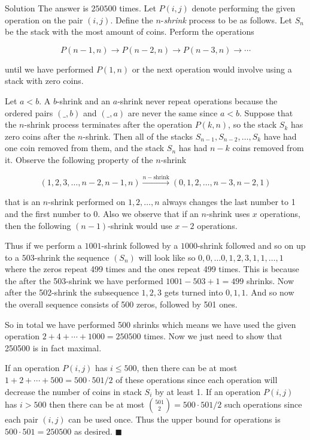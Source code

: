 \documentclass{article}
\begin{document}
\begin{solution}{Solution}
The answer is $250500$ times.
Let $P(i,j)$ denote
performing the given operation on the pair $(i,j)$.
Define the $n$-\textit{shrink} process to be as follows. Let $S_n$ be the
stack with the most amount of coins.
Perform the operations

$$
P(n-1,n) \rightarrow P(n-2,n) \rightarrow P(n-3,n) \rightarrow \cdots
$$

until we have performed $P(1,n)$ or the next operation would involve using
a stack with zero coins.\vspace{0.2cm}

Let $a<b$. A $b$-shrink and an $a$-shrink never repeat operations because
the ordered pairs $(\text{\_}, b)$ and $(\text{\_}, a)$ are never the same
since $a < b$.
Suppose that the $n$-shrink process terminates
after the operation $P(k,n)$, so the stack $S_k$ has zero coins after the
$n$-shrink.
Then all of the stacks $S_{n-1}, S_{n-2},
\ldots, S_k$ have had one coin removed from them, and the stack $S_n$ has
had $n-k$ coins removed from it. Observe the following property of the
$n$-shrink

$$
(1,2,3,\ldots,n-2, n-1, n) \overset{n-\text{shrink}}{\rightarrow}
(0,1,2,\ldots,n-3, n-2, 1)
$$

that is an $n$-shrink performed on $1,2,\ldots,n$ always changes the last
number to 1 and the first number to 0. Also we observe that if
an $n$-shrink uses $x$ operations, then the following $(n-1)$-shrink
would use $x-2$ operations. \vspace{0.2cm}

Thus if we perform a $1001$-shrink followed by a $1000$-shrink followed and
so on up to a $503$-shrink the sequence $(S_n)$ will look like so
$
0, 0,\ldots 0, 1, 2, 3, 1, 1, \ldots, 1
$
where the zeros repeat 499 times and the ones repeat 499 times. This is
because the after the 503-shrink we have performed $1001-503+1=499$ shrinks.
Now after the 502-shrink the subsequence $1,2,3$ gets turned into
$0,1,1$. And so now the overall sequence consists of 500 zeros, followed
by 501 ones.
\vspace{0.2cm}

So in total we have performed 500 shrinks which means we have used the
given operation
$2+ 4 + \cdots + 1000 = 250500$ times. Now we just need to show that
250500 is in fact maximal.\vspace{0.2cm}

If an operation $P(i,j)$ has $i\leq 500$, then there can be at most
$1+2+\cdots +500 = 500\cdot 501/2$ of these operations since each operation
will decrease the number of coins in stack $S_i$ by at least 1.
If an operation $P(i,j)$ has $i > 500$ then there can be at most
$\binom{501}{2} = 500\cdot 501/2$ such operations since each pair $(i,j)$
can be used once. Thus the upper bound for operations is $500\cdot 501=
250500$ as desired. $\blacksquare$
\end{solution}
\end{document}
